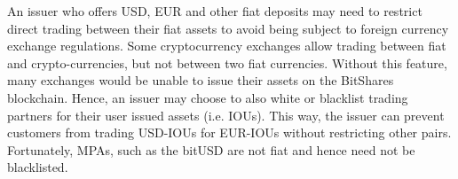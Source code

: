 An issuer who offers USD, EUR and other fiat deposits may need to restrict
direct trading between their fiat assets to avoid being subject to foreign
currency exchange regulations. Some cryptocurrency exchanges allow trading
between fiat and crypto-currencies, but not between two fiat currencies.
Without this feature, many exchanges would be unable to issue their assets on
the BitShares blockchain. Hence, an issuer may choose to also white or
blacklist trading partners for their user issued assets (i.e. IOUs). This way,
the issuer can prevent customers from trading USD-IOUs for EUR-IOUs without
restricting other pairs. Fortunately, MPAs, such as the bitUSD are not fiat and
hence need not be blacklisted.
